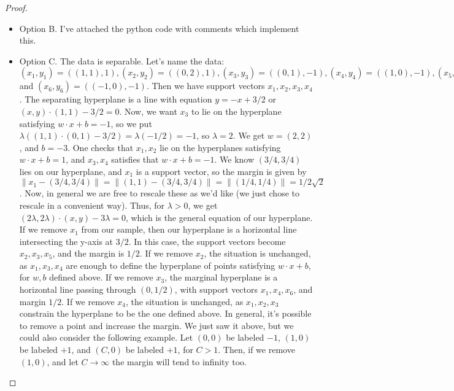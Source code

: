\documentclass[12pt]{article}
\newcommand{\norm}[1]{\lVert #1 \rVert}
\begin{document}
\begin{proof}
  \begin{itemize}
  \item
    Option B. I've attached the python code with comments which implement this.
  \item
    Option C. The data is separable. Let's name the data: $(x_1,y_1) = ((1,1),1), (x_2, y_2) = ((0,2),1), (x_3,y_3) = ((0,1), -1), (x_4,y_4) =  ((1,0), -1), (x_5,y_5) = ((2,2),1), $ and $ (x_6,y_6) = ((-1,0), -1)$.
    Then we have support vectors $x_1, x_2, x_3, x_4$. The separating hyperplane is a line with equation $y=-x+3/2$ or $(x,y) \cdot (1,1) - 3/2 = 0 $. Now, we want $x_3$ to lie on the hyperplane
    satisfying $w \cdot x + b = -1$, so we put $\lambda((1,1) \cdot (0,1) - 3/2) = \lambda ( - 1/2) = -1$, so $\lambda = 2$. We get $w = (2,2)$, and $b = -3$. One checks that $x_1, x_2$ lie on the hyperplanes satisfying
    $w \cdot x + b = 1$, and $x_3, x_4$ satisfies that $w \cdot x + b = -1$. We know $(3/4,3/4)$ lies on our hyperplane, and $x_1$ is a support vector, so the margin is given by
    $\norm{x_1 - (3/4,3/4)} = \norm{(1,1) - (3/4,3/4)} = \norm{(1/4,1/4)} = 1/2\sqrt{2}$. Now, in general we are free to rescale these as we'd like (we just chose to rescale in a convenient way).
    Thus, for $\lambda > 0$, we get $ (2\lambda, 2\lambda) \cdot (x,y) - 3 \lambda = 0$, which is the general equation of our hyperplane. If we remove $x_1$ from our sample, then our hyperplane is a horizontal line intersecting the y-axis at $3/2$. In this case,
    the support vectors become $x_2, x_3, x_5$, and the margin is $1/2$. If we remove $x_2$, the situation is unchanged, as $x_1, x_3, x_4$ are enough to define the hyperplane of points satisfying $w \cdot x + b$, for $w, b$ defined above. If we remove $x_3$, the marginal hyperplane is a horizontal line passing through $(0, 1/2)$, with support vectors $x_1, x_4, x_6 $, and margin $1/2$. If we remove $x_4$, the situation is unchanged, as $x_1, x_2, x_3$ constrain the hyperplane to be the one defined above. In general, it's possible to remove a point and increase the margin. We just saw it above, but we could also consider the following example. Let $(0,0)$ be labeled $-1$, $(1,0)$ be labeled $+1$, and $(C,0)$ be labeled $+1$, for $C>1$. Then, if we remove $(1,0)$, and let $C \to \infty$ the margin will tend to infinity too.


  \end{itemize}
\end{proof}
\end{document}
